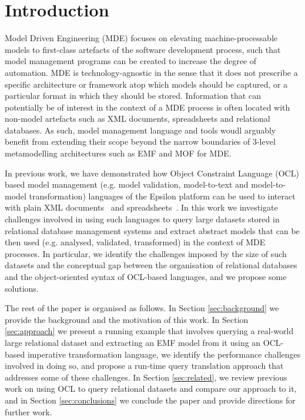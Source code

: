 \section{Introduction}

Model Driven Engineering (MDE) focuses on elevating machine-processable models to first-class artefacts of the software development process, such that model management programs can be created to increase the degree of automation. 
MDE is technology-agnostic in the sense that it does not prescribe a specific architecture or framework atop which models should be captured, or a particular format in which they should be stored.
Information that can potentially be of interest in the context of a MDE process is often located with non-model artefacts such as XML documents, spreadsheets and relational databases. 
As such, model management language and tools woudl arguably benefit from extending their scope beyond the narrow boundaries of 3-level metamodelling architectures such as EMF and MOF for MDE.

In previous work, we have demonstrated how Object Constraint Language (OCL) based model management (e.g. model validation, model-to-text and model-to-model transformation) languages of the Epsilon platform \cite{EpsilonICECCS} can be used to interact with plain XML documents~\cite{EpsilonXML} and spreadsheets~\cite{EpsilonSpreadsheets}. 
In this work we investigate challenges involved in using such languages to query large datasets stored in relational database management systems and extract abstract models that can be then used (e.g. analysed, validated, transformed) in the context of MDE processes.
In particular, we identify the challenges imposed by the size of such datasets and the conceptual gap between the organisation of relational databases and the object-oriented syntax of OCL-based languages, and we propose some solutions.

The rest of the paper is organised as follows. 
In Section \ref{sec:background} we provide the background and the motivation of this work.
In Section \ref{sec:approach} we present a running example that involves querying a real-world large relational dataset and extracting an EMF model from it using an OCL-based imperative transformation language, we identify the performance challenges involved in doing so, and propose a run-time query translation approach that addresses some of these challenges. 
In Section \ref{sec:related}, we review previous work on using OCL to query relational datasets and compare our approach to it, and in Section \ref{sec:conclusions} we conclude the paper and provide directions for further work.